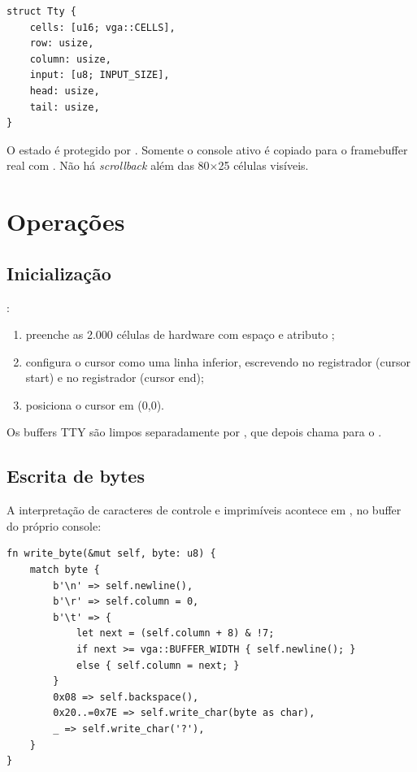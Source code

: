\begin{lstlisting}[caption={Estado mantido por console virtual.},label={lst:consolestate}]
struct Tty {
    cells: [u16; vga::CELLS],
    row: usize,
    column: usize,
    input: [u8; INPUT_SIZE],
    head: usize,
    tail: usize,
}
\end{lstlisting}

O estado \'e protegido por . Somente o
console ativo \'e copiado para o framebuffer real com .
N\~ao h\'a \emph{scrollback} al\'em das 80$\times$25 c\'elulas vis\'iveis.

\section{Opera\c{c}\~oes}

\subsection{Inicializa\c{c}\~ao}

:

\begin{enumerate}
  \item preenche as 2.000 c\'elulas de hardware com espa\c{c}o e atributo
        ;
  \item configura o cursor como uma linha inferior, escrevendo
         no registrador  (cursor start) e
         no registrador  (cursor end);
  \item posiciona o cursor em (0,0).
\end{enumerate}

Os buffers TTY s\~ao limpos separadamente por , que depois
chama  para o .

\subsection{Escrita de bytes}

A interpreta\c{c}\~ao de caracteres de controle e imprim\'iveis acontece em
, no buffer do pr\'oprio console:

\begin{lstlisting}[caption={Tratamento de caracteres de controle e imprim\'iveis.},label={lst:writebyte}]
fn write_byte(&mut self, byte: u8) {
    match byte {
        b'\n' => self.newline(),
        b'\r' => self.column = 0,
        b'\t' => {
            let next = (self.column + 8) & !7;
            if next >= vga::BUFFER_WIDTH { self.newline(); }
            else { self.column = next; }
        }
        0x08 => self.backspace(),
        0x20..=0x7E => self.write_char(byte as char),
        _ => self.write_char('?'),
    }
}
\end{lstlisting}

